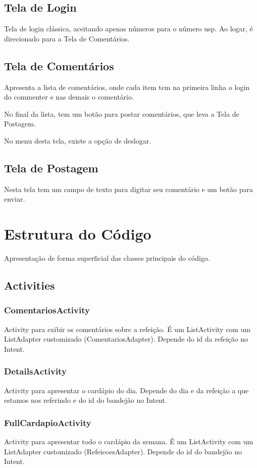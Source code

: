 \subsection{Tela de Login}
Tela de login clássica, aceitando apenas números para o número usp. Ao logar, é direcionado para a Tela de Comentários.

\subsection{Tela de Comentários}
Apresenta a lista de comentários, onde cada item tem na primeira linha o login do commenter e nas demais o comentário.

No final da lista, tem um botão para postar comentários, que leva a Tela de Postagem.

No menu desta tela, existe a opção de deslogar.

\subsection{Tela de Postagem}
Nesta tela tem um campo de texto para digitar seu comentário e um botão para enviar.

\section{Estrutura do Código}
Apresentação de forma superficial das classes principais do código.
\subsection{Activities}
\subsubsection{ComentariosActivity}
Activity para exibir os comentários sobre a refeição. É um ListActivity com um ListAdapter customizado (ComentariosAdapter). Depende do id da refeição no Intent.

\subsubsection{DetailsActivity}
Activity para apresentar o cardápio do dia. Depende do dia e da refeição a que estamos nos referindo e do id do bandejão no Intent.

\subsubsection{FullCardapioActivity}
Activity para apresentar todo o cardápio da semana. É um ListActivity com um ListAdapter customizado (RefeicoesAdapter).
Depende do id do bandejão no Intent.

